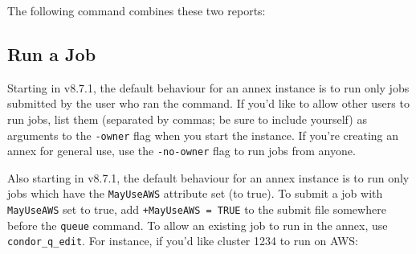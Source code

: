 The following command combines these two reports:

{\obeyspaces{}}

\subsection{Run a Job}

Starting in v8.7.1, the default behaviour for an annex instance is to run only
jobs submitted by the user who ran the  command.  If you'd
like to allow other users to run jobs, list them (separated by commas; be sure
to include yourself) as arguments to the \texttt{-owner} flag when you start
the instance.  If you're creating an annex for general use, use the
\texttt{-no-owner} flag to run jobs from anyone.

Also starting in v8.7.1, the default behaviour for an annex instance is to run
only jobs which have the \texttt{MayUseAWS} attribute set (to true).  To
submit a job with \texttt{MayUseAWS} set to true, add
\texttt{+MayUseAWS = TRUE} to the submit file somewhere before the
\texttt{queue} command.  To allow an existing job to run in the annex,
use \texttt{condor\_q\_edit}.  For instance, if you'd like cluster 1234 to run
on AWS:

